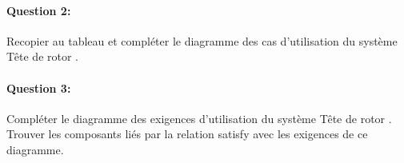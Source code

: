 \paragraph{Question 2:} Recopier au tableau et compléter le diagramme des cas d'utilisation du système \og Tête de rotor \fg.

\begin{center}
\end{center}

\paragraph{Question 3:} Compléter le diagramme des exigences d'utilisation du système \og Tête de rotor \fg. Trouver les composants liés par la relation \og satisfy \fg avec les exigences de ce diagramme.

\begin{center}
\end{center}

